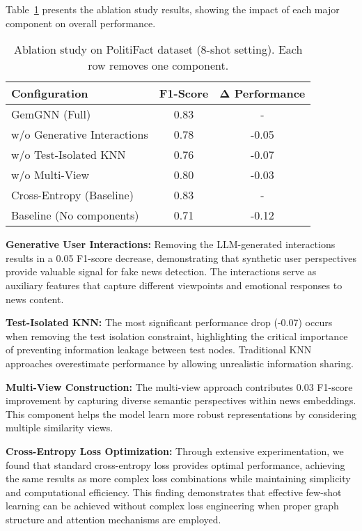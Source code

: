 Table~\ref{tab:ablation:components} presents the ablation study results, showing the impact of each major component on overall performance.

\begin{table}[htbp]
\centering
\caption{Ablation study on PolitiFact dataset (8-shot setting). Each row removes one component.}
\label{tab:ablation:components}
\begin{tabular}{lcc}
\toprule
\textbf{Configuration} & \textbf{F1-Score} & \textbf{Δ Performance} \\
\midrule
GemGNN (Full) & 0.83 & - \\
\midrule
w/o Generative Interactions & 0.78 & -0.05 \\
w/o Test-Isolated KNN & 0.76 & -0.07 \\
w/o Multi-View & 0.80 & -0.03 \\
Cross-Entropy (Baseline) & 0.83 & - \\
\midrule
Baseline (No components) & 0.71 & -0.12 \\
\bottomrule
\end{tabular}
\end{table}

\textbf{Generative User Interactions:} Removing the LLM-generated interactions results in a 0.05 F1-score decrease, demonstrating that synthetic user perspectives provide valuable signal for fake news detection. The interactions serve as auxiliary features that capture different viewpoints and emotional responses to news content.

\textbf{Test-Isolated KNN:} The most significant performance drop (-0.07) occurs when removing the test isolation constraint, highlighting the critical importance of preventing information leakage between test nodes. Traditional KNN approaches overestimate performance by allowing unrealistic information sharing.

\textbf{Multi-View Construction:} The multi-view approach contributes 0.03 F1-score improvement by capturing diverse semantic perspectives within news embeddings. This component helps the model learn more robust representations by considering multiple similarity views.

\textbf{Cross-Entropy Loss Optimization:} Through extensive experimentation, we found that standard cross-entropy loss provides optimal performance, achieving the same results as more complex loss combinations while maintaining simplicity and computational efficiency. This finding demonstrates that effective few-shot learning can be achieved without complex loss engineering when proper graph structure and attention mechanisms are employed.

